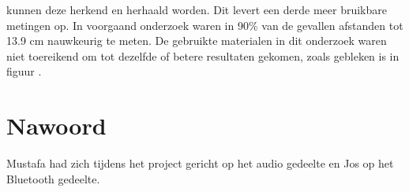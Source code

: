 \documentclass[12pt]{article}
\begin{document}
kunnen deze herkend en herhaald worden. Dit levert een derde meer bruikbare metingen op. In voorgaand onderzoek waren in 90\% van de gevallen afstanden tot 13.9 cm nauwkeurig te meten. De gebruikte materialen in dit onderzoek waren niet toereikend om tot dezelfde of betere resultaten gekomen, zoals gebleken is in figuur .

\section{Nawoord}
\label{sec:nawoord}
Mustafa had zich tijdens het project gericht op het audio gedeelte en Jos op het Bluetooth gedeelte.




\end{document}
